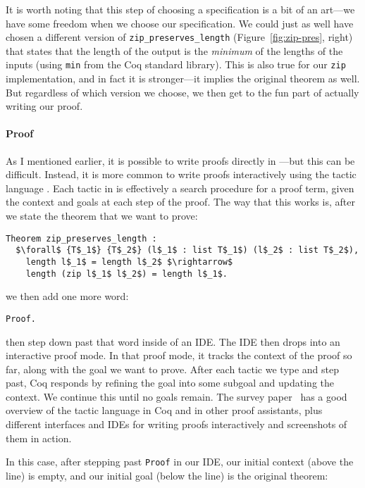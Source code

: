 It is worth noting that this step of choosing a specification is a bit of an art---we have some freedom when we choose our specification.
We could just as well have chosen a different version of \lstinline{zip_preserves_length} (Figure~\ref{fig:zip-pres}, right)
that states that the length of the output is the \textit{minimum} of the lengths of the inputs (using \lstinline{min} from the Coq standard library).
This is also true for our \lstinline{zip} implementation, and in fact it is stronger---it implies the original theorem as well.
But regardless of which version we choose, we then get to the fun part of actually writing our proof.

\paragraph{Proof} As I mentioned earlier, it is possible to write proofs directly in ---but this can be difficult.
Instead, it is more common to write proofs interactively using the tactic language .
Each tactic in  is effectively a search procedure for a proof term, given the context and goals at each step of the proof.
The way that this works is, after we state the theorem that we want to prove:

\begin{lstlisting}
Theorem zip_preserves_length :
  $\forall$ {T$_1$} {T$_2$} (l$_1$ : list T$_1$) (l$_2$ : list T$_2$),
    length l$_1$ = length l$_2$ $\rightarrow$
    length (zip l$_1$ l$_2$) = length l$_1$.
\end{lstlisting}
we then add one more word:

\begin{lstlisting}
Proof.
\end{lstlisting}
then step down past that word inside of an IDE. %
The IDE then drops into an interactive proof mode.
In that proof mode, it tracks the context of the proof so far, along with the goal we want to prove.
After each tactic we type and step past, Coq responds by refining the goal into some subgoal
and updating the context.
We continue this until no goals remain.
The survey paper~\cite{PGL-045} has a good overview of the tactic language in Coq and in other proof assistants,
plus different interfaces and IDEs for writing proofs interactively and screenshots of them in action.

In this case, after stepping past \lstinline{Proof} in our IDE, 
our initial context (above the line) is empty, and our initial goal (below the line) is the original theorem:

